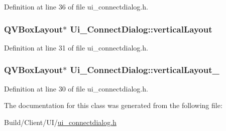 Definition at line 36 of file ui\+\_\+connectdialog.\+h.

\hypertarget{class_ui___connect_dialog_adb61150afd9d42746d74944f60d9891a}{}
\subsubsection[{vertical\+Layout}]{\setlength{\rightskip}{0pt plus 5cm}Q\+V\+Box\+Layout$\ast$ Ui\+\_\+\+Connect\+Dialog\+::vertical\+Layout}\label{class_ui___connect_dialog_adb61150afd9d42746d74944f60d9891a}


Definition at line 31 of file ui\+\_\+connectdialog.\+h.

\hypertarget{class_ui___connect_dialog_af2893d6f1797b739380e7b0573cc8f12}{}
\subsubsection[{vertical\+Layout\+\_\+2}]{\setlength{\rightskip}{0pt plus 5cm}Q\+V\+Box\+Layout$\ast$ Ui\+\_\+\+Connect\+Dialog\+::vertical\+Layout\+\_}\label{class_ui___connect_dialog_af2893d6f1797b739380e7b0573cc8f12}


Definition at line 30 of file ui\+\_\+connectdialog.\+h.



The documentation for this class was generated from the following file\+:\begin{DoxyCompactItemize}
\item 
Build/\+Client/\+U\+I/\hyperlink{ui__connectdialog_8h}{ui\+\_\+connectdialog.\+h}\end{DoxyCompactItemize}

